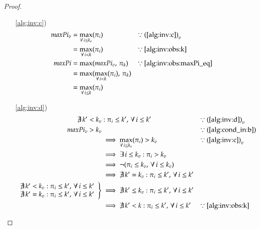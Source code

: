 \documentclass[../../../relazione.tex]{subfiles}
\begin{document}
\begin{proof}
\begin{itemize}
        \item[\ref{alg:inv:c})]
            \begin{align*}
                maxPi_v
                 & = \max_{\forall\, i \leq k_v}(\pi_i)           & \because & \mbox{ (\ref{alg:inv:c})}_v        \\
                 & = \max_{\forall\, i < k}(\pi_i)                & \because & \mbox{ \ref{alg:inv:obs:k}}        \\
                maxPi
                 & = \max(maxPi_v,\, \pi_k)                       & \because & \mbox{ \ref{alg:inv:obs:maxPi_eq}} \\
                 & = \max(\max_{\forall\, i < k}(\pi_i),\, \pi_k)                                                 \\
                 & = \max_{\forall\, i \leq k}(\pi_i)
            \end{align*}

        \item[\ref{alg:inv:d})]
            \begin{align*}
                \not\exists\, k' < k_v & : \pi_i \leq k',\, \forall\, i \leq k'                                    & \because & \mbox{ (\ref{alg:inv:d})}_v   \\
                maxPi_v > k_v          &                                                                           & \because & \mbox{ (\ref{alg:cond_in:b})} \\
                                       & \implies \max_{\forall\, i \leq k_v}(\pi_i) > k_v                         & \because & \mbox{ (\ref{alg:inv:c})}_v   \\
                                       & \implies \exists\, i \leq k_v : \pi_i > k_v                                                                          \\
                                       & \implies \neg(\pi_i \leq k_v,\, \forall\, i \leq k_v)                                                                \\
                                       & \implies \not\exists\, k' = k_v : \pi_i \leq k',\, \forall\, i \leq k'                                               \\
                \left.
                \begin{array}{r}
                    \not\exists\, k' < k_v : \pi_i \leq k',\, \forall\, i \leq k' \\
                    \not\exists\, k' = k_v : \pi_i \leq k',\, \forall\, i \leq k'
                \end{array}
                \right\}
                                       & \implies \not\exists\, k' \leq k_v : \pi_i \leq k',\, \forall\, i \leq k'                                            \\
                                       & \implies \not\exists\, k' < k : \pi_i \leq k',\, \forall\, i \leq k'      & \because & \mbox{ \ref{alg:inv:obs:k}}
            \end{align*}


\end{itemize}
\end{proof}
\end{document}
